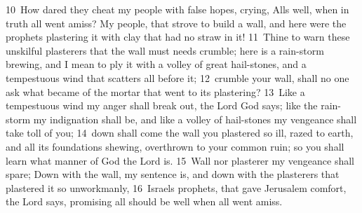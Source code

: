 \documentclass[10pt]{book} %
\begin{document}
\textcolor{benred8}{10}~How dared they cheat my people with false hopes, crying, All\textquotesingle s well, when in truth all went amiss? My people, that strove to build a wall, and here were the prophets plastering it with clay that had no straw in it! \textcolor{benred8}{11}~Thine to warn these unskilful plasterers that the wall must needs crumble; here is a rain-storm brewing, and I mean to ply it with a volley of great hail-stones, and a tempestuous wind that scatters all before it; \textcolor{benred8}{12}~crumble your wall, shall no one ask what became of the mortar that went to its plastering? \textcolor{benred8}{13}~Like a tempestuous wind my anger shall break out, the Lord God says; like the rain-storm my indignation shall be, and like a volley of hail-stones my vengeance shall take toll of you; \textcolor{benred8}{14}~down shall come the wall you plastered so ill, razed to earth, and all its foundations shewing, overthrown to your common ruin; so you shall learn what manner of God the Lord is. \textcolor{benred8}{15}~Wall nor plasterer my vengeance shall spare; Down with the wall, my sentence is, and down with the plasterers that plastered it so unworkmanly, \textcolor{benred8}{16}~Israel\textquotesingle s prophets, that gave Jerusalem comfort, the Lord says, promising all should be well when all went amiss.
\end{document}
